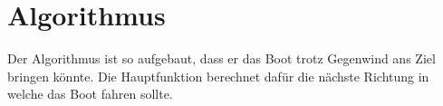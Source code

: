 \chapter{Algorithmus}
\label{appendix:algorythmus}

Der Algorithmus ist so aufgebaut, dass er das Boot trotz Gegenwind ans Ziel bringen könnte. Die Hauptfunktion berechnet dafür die nächste Richtung in welche das Boot fahren sollte.






